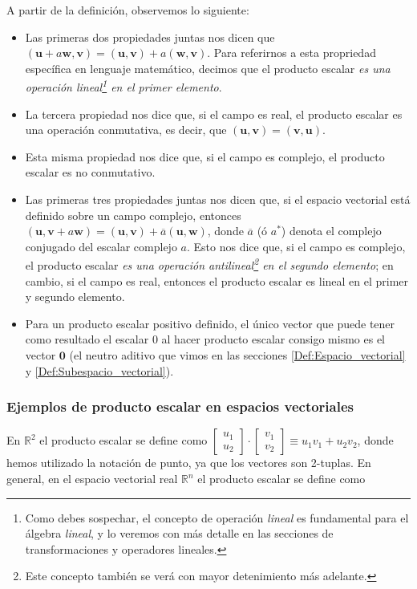 \documentclass[12pt]{article}
\begin{document}
A partir de la definición, observemos lo siguiente:

\begin{itemize}
    \item Las primeras dos propiedades juntas nos dicen que $(\mathbf{u}+a\mathbf{w},\mathbf{v}) = (\mathbf{u},\mathbf{v})+a(\mathbf{w},\mathbf{v})$. Para referirnos a esta propriedad específica en lenguaje matemático, decimos que el producto escalar \textit{es una operación lineal\footnote{Como debes sospechar, el concepto de operación \emph{lineal} es fundamental para el álgebra \emph{lineal}, y lo veremos con más detalle en las secciones de transformaciones y operadores lineales.} en el primer elemento}.
    \item La tercera propiedad nos dice que, si el campo es real, el producto escalar es una operación conmutativa, es decir, que $(\mathbf{u},\mathbf{v})=(\mathbf{v},\mathbf{u})$.
    \item Esta misma propiedad nos dice que, si el campo es complejo, el producto escalar es no conmutativo.
    \item Las primeras tres propiedades juntas nos dicen que, si el espacio vectorial está definido sobre un campo complejo, entonces $(\mathbf{u},\mathbf{v}+a\mathbf{w}) = (\mathbf{u},\mathbf{v})+\overline{a}(\mathbf{u},\mathbf{w})$, donde $\overline{a}$ (ó $a^*$) denota el complejo conjugado del escalar complejo $a$. Esto nos dice que, si el campo es complejo, el producto escalar \textit{es una operación antilineal\footnote{Este concepto también se verá con mayor detenimiento más adelante.} en el segundo elemento}; en cambio, si el campo es real, entonces el producto escalar es lineal en el primer y segundo elemento.
    \item Para un producto escalar positivo definido, el único vector que puede tener como resultado el escalar $0$ al hacer producto escalar consigo mismo es el vector $\mathbf{0}$ (el neutro aditivo que vimos en las secciones \ref{Def:Espacio_vectorial} y \ref{Def:Subespacio_vectorial}).
\end{itemize}{}

\subsubsection{Ejemplos de producto escalar en espacios vectoriales} \label{Ejem:Producto_escalar}

En $\mathbb{R}^2$ el producto escalar se define como $\begin{bmatrix}u_1\\u_2\end{bmatrix}\cdot\begin{bmatrix}v_1\\v_2\end{bmatrix} \equiv u_1v_1+u_2v_2$, donde hemos utilizado la notación de punto, ya que los vectores son 2-tuplas. En general, en el espacio vectorial real $\mathbb{R}^n$ el producto escalar se define como
\end{document}
